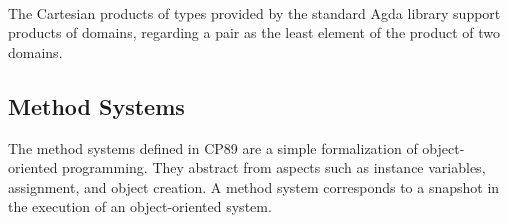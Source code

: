 \begin{AgdaAlign}
\begin{code}
%
\>[63]\<%
\\
\>[17][@{}l@{\AgdaIndent{0}}]%
\>[19]\AgdaSymbol{(}\AgdaSpace{}%
\AgdaSpace{}%
\AgdaSpace{}%
\AgdaSpace{}%
\AgdaSpace{}%
\AgdaSpace{}%
\AgdaSpace{}%
\AgdaSpace{}%
\AgdaSymbol{)}\AgdaSpace{}%
\AgdaSpace{}%
\AgdaSymbol{(}\AgdaSpace{}%
\AgdaSpace{}%
\AgdaSpace{}%
\AgdaSpace{}%
\AgdaSpace{}%
\AgdaSpace{}%
\AgdaSpace{}%
\AgdaSpace{}%
\AgdaSymbol{)}\AgdaSpace{}%
\AgdaSpace{}%
\AgdaSpace{}%
\AgdaSpace{}%
\AgdaSpace{}%
\AgdaSpace{}%
\AgdaSpace{}%
\AgdaSpace{}%
\AgdaSpace{}%
\AgdaSpace{}%
\AgdaSpace{}%
\AgdaSymbol{)}\<%
\end{code}
%
The Cartesian products of types provided by the standard Agda library support products of domains,
regarding a pair  as the least element of the product of two domains.  

\subsection{Method Systems}

The method systems defined in CP89 are a simple formalization of object-oriented programming.
They abstract from aspects such as instance variables, assignment, and object creation.
A method system corresponds to a snapshot in the execution of an object-oriented system.


\end{AgdaAlign}
